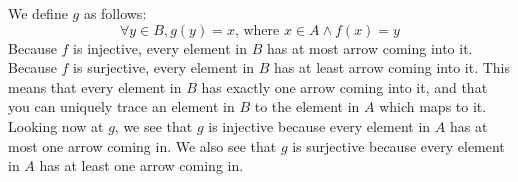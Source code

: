 \documentclass[solution, letterpaper]{cs20}
\begin{document}
\begin{solution}
\noindent We define $g$ as follows:
$$\forall y \in B, g(y) = x\text{, where }x \in A \wedge f(x) = y$$
\noindent Because $f$ is injective, every element in $B$ has at most arrow coming into it. Because $f$ is surjective, every element in $B$ has at least arrow coming into it. This means that every element in $B$ has exactly one arrow coming into it, and that you can uniquely trace an element in $B$ to the element in $A$ which maps to it.
\noindent Looking now at $g$, we see that $g$ is injective because every element in $A$ has at most one arrow coming in. We also see that $g$ is surjective because every element in $A$ has at least one arrow coming in.

\end{solution}
\end{document}
